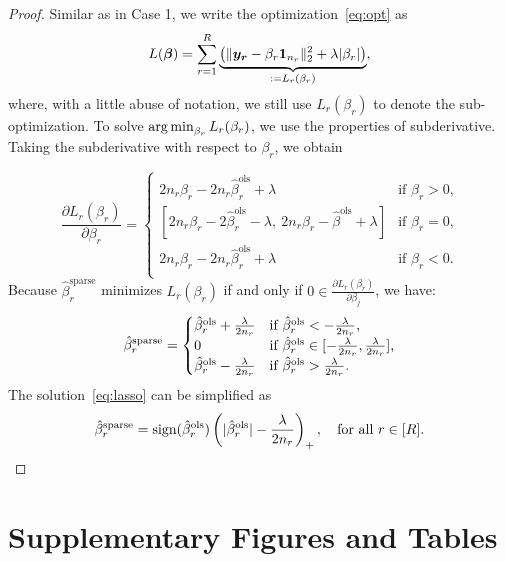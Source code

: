 \documentclass{article}
\newcommand*{\KeepStyleUnderBrace}[1]{%
  \mathop{%
    \mathchoice
    {\underbrace{\displaystyle#1}}%
    {\underbrace{\textstyle#1}}%
    {\underbrace{\scriptstyle#1}}%
    {\underbrace{\scriptscriptstyle#1}}%
  }\limits
}
\begin{document}
\begin{appendices}
\begin{proof}
Similar as in Case 1, we write the optimization~\eqref{eq:opt} as
\[
L({\bm \beta})=\sum_{r=1}^R\KeepStyleUnderBrace{\left(\vnormSize{}{\my_{\mr}-\beta_r\mathbf{1}_{n_r}}^2+\lambda |\beta_{r}|\right)}_{:=L_r(\beta_r)},
\]
where, with a little abuse of notation, we still use $L_r(\beta_r)$ to denote the sub-optimization. To solve $\operatorname*{arg\,min}_{\beta_r}L_r(\beta_r)$, we use the properties of subderivative. Taking the subderivative with respect to $\beta_r$, we obtain
	
\begin{equation}
\frac{\partial L_r(\beta_r)}{\partial \beta_r} = 
\begin{cases}
2n_r\beta_r-2n_r\hat \beta^{\text{ols}}_r+\lambda &\mbox{if $\beta_r>0$,}\\
 [2n_r\beta_r-2\hat \beta^{\text{ols}}_r-\lambda, \ 2n_r\beta_r-\hat \beta^{\text{ols}}+\lambda]&\mbox{if $\beta_r=0$,}\\
2n_r\beta_r-2n_r\hat \beta^{\text{ols}}_r+\lambda &\mbox{if $\beta_r<0$.}\\
\end{cases}
\end{equation}
Because $\hat \beta^{\text{sparse}}_r$ minimizes $L_r(\beta_r)$ if and only if $0 \in \frac{\partial L_r(\beta_r)}{\partial \beta_j}$, we have:
\begin{equation}\label{eq:lasso}
\hat \beta^{\text{sparse}}_r=
\begin{cases}
\hat \beta^{\text{ols}}_r+{\lambda\over 2n_r}&\mbox{if $\hat \beta^{\text{ols}}_r<-{\lambda \over 2n_r}$,}\\
0 &\mbox{if $\hat \beta^{\text{ols}}_r\in[-{\lambda \over 2n_r},{\lambda \over 2n_r}]$,}\\
\hat \beta^{\text{ols}}_r-{\lambda\over 2n_r}&\mbox{if $\hat \beta^{\text{ols}}_r>{\lambda \over 2n_r}$.}\\
\end{cases}
\end{equation}
The solution~\eqref{eq:lasso} can be simplified as 
\[
\hat \beta^{\text{sparse}}_r=\text{sign}(\hat \beta^{\text{ols}}_r)\left(|\hat \beta^{\text{ols}}_r|-{\lambda\over 2n_r}\right)_{+},\quad \text{for all $r\in[R]$}.
\]
\qedhere
\end{proof}

\section{Supplementary Figures and Tables}


\end{appendices}
\end{document}

